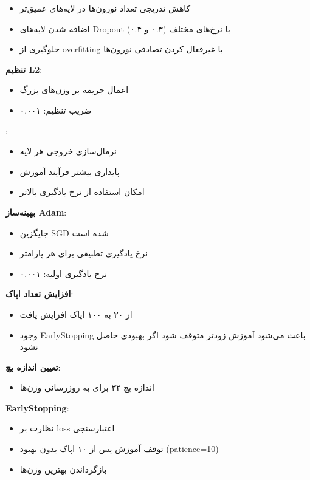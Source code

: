 \documentclass{article}
\begin{document}
\begin{itemize}
    \item کاهش تدریجی تعداد نورون‌ها در لایه‌های عمیق‌تر
\end{itemize}

\begin{itemize}
\item اضافه شدن لایه‌های Dropout با نرخ‌های مختلف (۰.۳ و ۰.۴)
\item جلوگیری از overfitting با غیرفعال کردن تصادفی نورون‌ها
\end{itemize}

\textbf{تنظیم L2}:

\begin{itemize}
    \item اعمال جریمه بر وزن‌های بزرگ
    \item ضریب تنظیم: ۰.۰۰۱
\end{itemize}

\textbf{}:

\begin{itemize}
    \item نرمال‌سازی خروجی هر لایه
    \item پایداری بیشتر فرآیند آموزش
    \item امکان استفاده از نرخ یادگیری بالاتر
\end{itemize}

\textbf{بهینه‌ساز Adam}:

\begin{itemize}
\item جایگزین SGD شده است
\item نرخ یادگیری تطبیقی برای هر پارامتر
\item نرخ یادگیری اولیه: ۰.۰۰۱
\end{itemize}

\textbf{افزایش تعداد اپاک}:
\begin{itemize}
    \item از ۲۰ به ۱۰۰ اپاک افزایش یافت
    \item وجود EarlyStopping باعث می‌شود آموزش زودتر متوقف شود اگر بهبودی حاصل نشود
\end{itemize}

\textbf{تعیین اندازه بچ}:
\begin{itemize}
    \item اندازه بچ ۳۲ برای به روزرسانی وزن‌ها
\end{itemize}

\textbf{EarlyStopping}:

\begin{itemize}
\item نظارت بر loss اعتبارسنجی
\item توقف آموزش پس از ۱۰ اپاک بدون بهبود (patience=10)
\item بازگرداندن بهترین وزن‌ها
\end{itemize}
\end{document}
